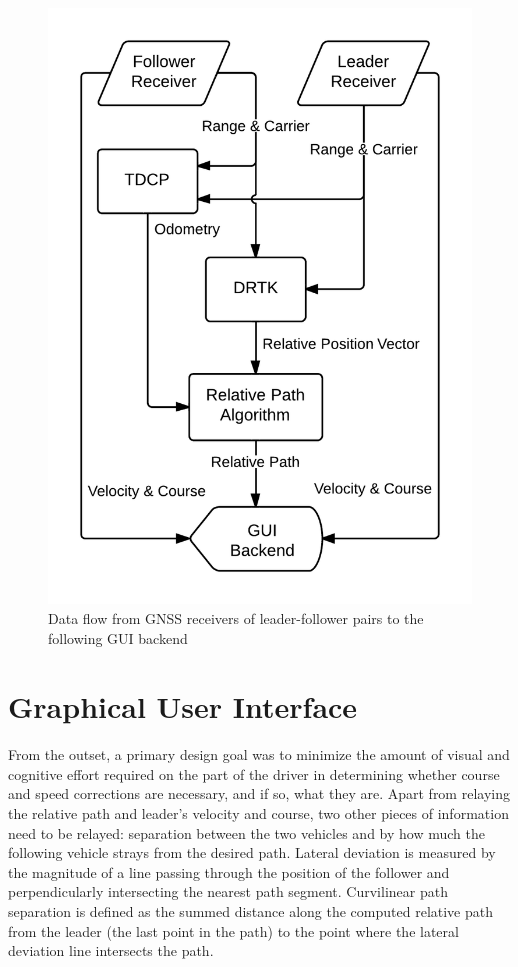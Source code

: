 \documentclass[twocolumn,10pt]{article}
\begin{document}
  \begin{figure}[ht] \centering
    \includegraphics[width=0.8\columnwidth]{../graphics/data_algo.png}
    \caption{Data flow from GNSS receivers of leader-follower pairs to the following GUI backend}
    \label{fig:data_flow}
  \end{figure}



\section*{Graphical User Interface}

  From the outset, a primary design goal was to minimize the amount of visual and cognitive effort required on the part of the driver in determining whether course and speed corrections are necessary, and if so, what they are.
  Apart from relaying the relative path and leader's velocity and course, two other pieces of information need to be relayed: separation between the two vehicles and by how much the following vehicle strays from the desired path.
  Lateral deviation is measured by the magnitude of a line passing through the position of the follower and perpendicularly intersecting the nearest path segment.
  Curvilinear path separation is defined as the summed distance along the computed relative path from the leader (the last point in the path) to the point where the lateral deviation line intersects the path.
\end{document}
